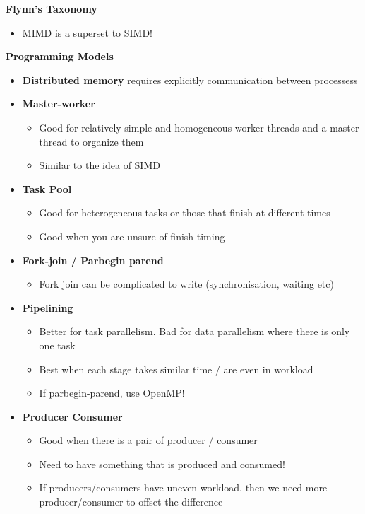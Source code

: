 \documentclass[10pt, landscape]{article}
\begin{document}
\begin{multicols}{4}
\textbf{Flynn's Taxonomy}
\begin{itemize}
    \item MIMD is a superset to SIMD!
\end{itemize}

\textbf{Programming Models}
\begin{itemize}
    \item \textbf{Distributed memory} requires explicitly communication between processess
    \item \textbf{Master-worker}
    \begin{itemize}
        \item Good for relatively simple and homogeneous worker threads and a master thread to organize them
        \item Similar to the idea of SIMD 
    \end{itemize}
    \item \textbf{Task Pool}
    \begin{itemize}
        \item Good for heterogeneous tasks or those that finish at different times 
        \item Good when you are unsure of finish timing
    \end{itemize}
    \item \textbf{Fork-join / Parbegin parend}
    \begin{itemize}
        \item Fork join can be complicated to write (synchronisation, waiting etc)
    \end{itemize}
    \item \textbf{Pipelining}
    \begin{itemize}
        \item Better for task parallelism. Bad for data parallelism where there is only one task 
        \item Best when each stage takes similar time / are even in workload
        \item If parbegin-parend, use OpenMP!
    \end{itemize}
    \item \textbf{Producer Consumer}
    \begin{itemize}
        \item Good when there is a pair of producer / consumer 
        \item Need to have something that is produced and consumed!
        \item If producers/consumers have uneven workload, then we need more producer/consumer to offset the difference
    \end{itemize}
\end{itemize}


\end{multicols}
\end{document}
